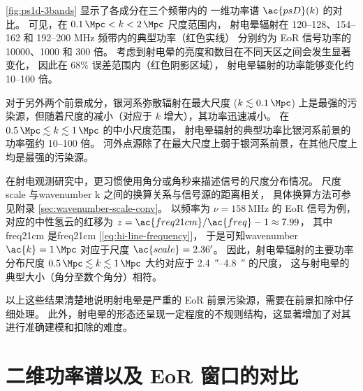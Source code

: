 \autoref{fig:ps1d-3bands} 显示了各成分在三个频带内的
一维功率谱 $\ac{psD}(k)$ 的对比。
可见，在 $\SI{0.1}{\per\Mpc} < k < \SI{2}{\per\Mpc}$ 尺度范围内，
射电晕辐射在 \numrange{120}{128}、\numrange{154}{162} 和
\numrange{192}{200} \si{\MHz} 频带内的典型功率（红色实线）
分别约为 EoR 信号功率的 \num{10000}、1000 和 300 倍。
考虑到射电晕的亮度和数目在不同天区之间会发生显著变化，
因此在 68\% 误差范围内（红色阴影区域），
射电晕辐射的功率能够变化约 \numrange{10}{100} 倍。

对于另外两个前景成分，银河系弥散辐射在最大尺度 ($k \lesssim \SI{0.1}{\per\Mpc}$)
上是最强的污染源，但随着尺度的减小（对应于 $k$ 增大），其功率迅速减小。
在 $\SI{0.5}{\per\Mpc} \lesssim k \lesssim \SI{1}{\per\Mpc}$
的中小尺度范围，
射电晕辐射的典型功率比银河系前景的功率强约 \numrange{10}{100} 倍。
河外点源除了在最大尺度上弱于银河系前景，在其他尺度上均是最强的污染源。

在射电观测研究中，更习惯使用角分或角秒来描述信号的尺度分布情况。
尺度 \ac{scale} 与\ac{wavenumber} \ac{k} 之间的换算关系与信号源的距离相关，
具体换算方法可参见附录 \autoref{sec:wavenumber-scale-conv}。
以频率为 $\nu = \SI{158}{\MHz}$ 的 EoR 信号为例，对应的中性氢云的红移为
$z = \ac{freq21cm} / \ac{freq} - 1 \approx 7.99$，
其中 \ac{freq21cm} 是\acl{freq21cm} [\autoref{eq:hi-line-frequency}]，
于是可知\ac{wavenumber} $\ac{k} = \SI{1}{\per\Mpc}$
对应于尺度 $\ac{scale} = \SI{2.36}{\arcminute}$。
因此，射电晕辐射的主要功率分布尺度
$\SI{0.5}{\per\Mpc} \lesssim k \lesssim \SI{1}{\per\Mpc}$
大约对应于 \SIrange[range-units=repeat]{2.4}{4.8}{\arcsecond} 的尺度，
这与射电晕的典型大小（角分至数个角分）相符。

以上这些结果清楚地说明射电晕是严重的 EoR 前景污染源，需要在前景扣除中仔细处理。
此外，射电晕的形态还呈现一定程度的不规则结构，这显著增加了对其进行准确建模和扣除的难度。


\section{二维功率谱以及 EoR 窗口的对比}
\label{sec:ps2d}

